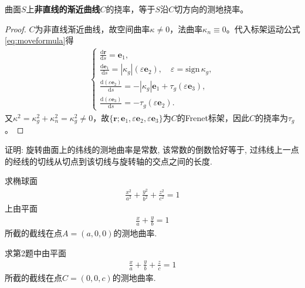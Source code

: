 \documentclass[../../main.tex]{subfiles}%
\begin{document}
\begin{theorem}
曲面$S$上\textbf{非直线的渐近曲线}$C$的挠率，等于$S$沿$C$切方向的测地挠率。
\end{theorem}
\begin{proof}

$C$为非直线渐近曲线，故空间曲率$\kappa\neq0$，法曲率$\kappa_n\equiv0$。代入标架运动公式\eqref{eq:moveformula}得
\begin{align*}
\begin{cases}
\displaystyle\frac{\mathrm{d}\boldsymbol{r}}{\mathrm{d}s}=\boldsymbol{e}_1,\\
\displaystyle\frac{\mathrm{d}\boldsymbol{e}_1}{\mathrm{d}s}=|\kappa_g|(\varepsilon\boldsymbol{e}_2),\quad \varepsilon=\mathrm{sign}\,\kappa_g,\\
\displaystyle\frac{\mathrm{d}(\varepsilon\boldsymbol{e}_2)}{\mathrm{d}s}=-|\kappa_g|\boldsymbol{e}_1+\tau_g(\varepsilon\boldsymbol{e}_3),\\
\displaystyle\frac{\mathrm{d}(\varepsilon\boldsymbol{e}_3)}{\mathrm{d}s}=-\tau_g(\varepsilon\boldsymbol{e}_2).
\end{cases}
\end{align*}
又$\kappa^2=\kappa_g^2+\kappa_n^2=\kappa_g^2\neq0$，故$\{\boldsymbol{r};\boldsymbol{e}_1,\varepsilon\boldsymbol{e}_2,\varepsilon\boldsymbol{e}_3\}$为$C$的Frenet标架，因此$C$的挠率为$\tau_g$。

\end{proof}

\begin{example}
证明: 旋转曲面上的纬线的测地曲率是常数, 该常数的倒数恰好等于, 过纬线上一点的经线的切线从切点到该切线与旋转轴的交点之间的长度.
\end{example}

\begin{example}
求椭球面
\begin{align*}
\frac{x^2}{a^2}+\frac{y^2}{b^2}+\frac{z^2}{c^2}=1
\end{align*}
上由平面
\begin{align*}
\frac{x}{a}+\frac{y}{b}=1
\end{align*}
所截的截线在点$A=(a,0,0)$的测地曲率.
\end{example}

\begin{example}
求第2题中由平面
\begin{align*}
\frac{x}{a}+\frac{y}{b}+\frac{z}{c}=1
\end{align*}
所截的截线在点$C=(0,0,c)$的测地曲率.
\end{example}
\end{document}
